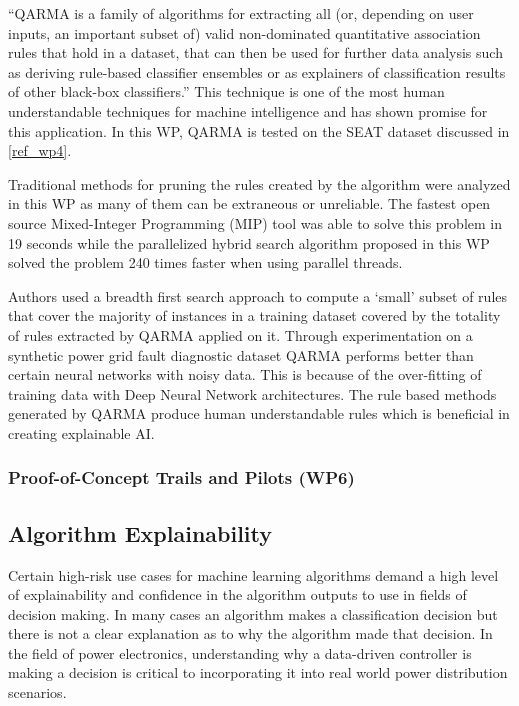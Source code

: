 \enquote{QARMA is a family of algorithms for extracting all (or, depending on user inputs, an important subset of) valid non-dominated quantitative association rules that hold in a dataset, that can then be used for further data analysis such as deriving rule-based classifier ensembles or as explainers of classification results of other black-box classifiers.}  This technique is one of the most human understandable techniques for machine intelligence and has shown promise for this application. In this WP, QARMA is tested on the SEAT dataset discussed in \ref{ref_wp4}.

Traditional methods for pruning the rules created by the algorithm were analyzed in this WP as many of them can be extraneous or unreliable. The fastest open source Mixed-Integer Programming (MIP) tool was able to solve this problem in 19 seconds while the parallelized hybrid search algorithm proposed in this WP solved the problem 240 times faster when using parallel threads.

Authors \cite{wp5.1} used a breadth first search approach to compute a `small' subset of rules that cover the majority of instances in a training dataset covered by the totality of rules extracted by QARMA applied on it. Through experimentation on a synthetic power grid fault diagnostic dataset QARMA performs better than certain neural networks with noisy data. This is because of the over-fitting of training data with Deep Neural Network architectures. The rule based methods generated by QARMA produce human understandable rules which is beneficial in creating explainable AI.

\subsubsection{Proof-of-Concept Trails and Pilots (WP6)}
\label{ref_wp6}


\subsection{Algorithm Explainability}

Certain high-risk use cases for machine learning algorithms demand a high level of explainability and confidence in the algorithm outputs to use in fields of decision making. In many cases an algorithm makes a classification decision but there is not a clear explanation as to why the algorithm made that decision. In the field of power electronics, understanding why a data-driven controller is making a decision is critical to incorporating it into real world power distribution scenarios. 

